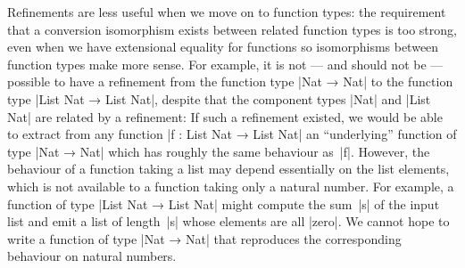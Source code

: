 Refinements are less useful when we move on to function types: the requirement that a conversion isomorphism exists between related function types is too strong, even when we have extensional equality for functions so isomorphisms between function types make more sense.
For example, it is not --- and should not be --- possible to have a refinement from the function type |Nat → Nat| to the function type |List Nat → List Nat|, despite that the component types |Nat| and |List Nat| are related by a refinement:
If such a refinement existed, we would be able to extract from any function |f : List Nat → List Nat| an ``underlying'' function of type |Nat → Nat| which has roughly the same behaviour as~|f|.
However, the behaviour of a function taking a list may depend essentially on the list elements, which is not available to a function taking only a natural number.
For example, a function of type |List Nat → List Nat| might compute the sum~|s| of the input list and emit a list of length~|s| whose elements are all |zero|.
We cannot hope to write a function of type |Nat → Nat| that reproduces the corresponding behaviour on natural numbers.

